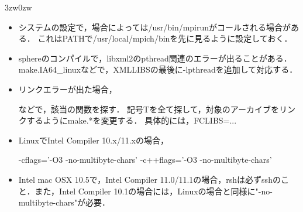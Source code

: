 \begin{enumerate}
\begin{indentation}{3zw}{0zw}
\begin{itemize}
\item システムの設定で，場合によっては/usr/bin/mpirunがコールされる場合がある．
これはPATHで/usr/local/mpich/binを先に見るように設定しておく．
\vspace{3mm}

\item sphereのコンパイルで，libxml2のpthread関連のエラーが出ることがある．
make.IA64\_linuxなどで，XMLLIBSの最後に-lpthreadを追加して対応する．
\vspace{3mm}

\item リンクエラーが出た場合，
{\small
{}
}
などで，該当の関数を探す．
記号Tを全て探して，対象のアーカイブをリンクするようにmake.*を変更する．
具体的には，FCLIBS=...
\vspace{3mm}

\item LinuxでIntel Compiler 10.x/11.xの場合，
{\small
\begin{program}
-cflags='-O3 -no-multibyte-chars' -c++flags='-O3 -no-multibyte-chars'
\end{program}
}
\vspace{3mm}

\item Intel mac OSX 10.5で，Intel Compiler 11.0/11.1の場合，rshは必ずsshのこと．また，Intel Compiler 10.1の場合には，Linuxの場合と同様に"-no-multibyte-chars"が必要．
{\small
{}
}
\vspace{3mm}

\end{itemize}
\end{indentation}

\end{enumerate}


